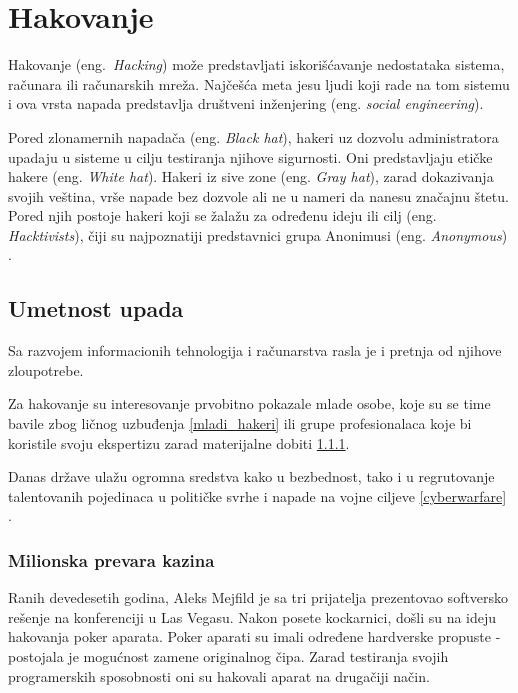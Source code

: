 \documentclass[a4paper]{article}
\begin{document}
\section{Hakovanje}
Hakovanje (eng.~{\em Hacking}) može predstavljati iskorišćavanje nedostataka sistema, računara ili računarskih mreža. Najčešća meta jesu ljudi koji rade na tom sistemu i ova vrsta napada predstavlja društveni inženjering (eng. \textit{social engineering}).

Pored zlonamernih napadača (eng. \textit{Black hat}), hakeri uz dozvolu administratora upadaju u sisteme u cilju testiranja njihove sigurnosti. Oni predstavljaju etičke hakere (eng. \textit{White hat}). Hakeri iz sive zone (eng. \textit{Gray hat}), zarad dokazivanja svojih veština, vrše napade bez dozvole ali ne u nameri da nanesu značajnu štetu. Pored njih postoje hakeri koji se žalažu za određenu ideju ili cilj (eng. \textit{Hacktivists}), čiji su najpoznatiji predstavnici grupa Anonimusi (eng. \textit{Anonymous}) \cite{hackers_hat}.
 
\subsection{Umetnost upada}
\label{sec:intrusion}

Sa razvojem informacionih tehnologija i računarstva rasla je i pretnja od njihove zloupotrebe. 

Za hakovanje su interesovanje prvobitno pokazale mlade osobe, koje su se time bavile zbog ličnog uzbuđenja \ref{mladi_hakeri} ili grupe profesionalaca koje bi koristile svoju ekspertizu zarad materijalne dobiti \ref{milionska_prevara_kazina}.

Danas države ulažu ogromna sredstva kako u bezbednost, tako i u regrutovanje talentovanih pojedinaca u političke svrhe i napade na vojne ciljeve \ref{cyberwarfare} \cite{intrusion}.

\subsubsection{Milionska prevara kazina}
\label{milionska_prevara_kazina}

Ranih devedesetih godina, Aleks Mejfild je sa tri prijatelja prezentovao softversko rešenje na konferenciji u Las Vegasu. Nakon posete kockarnici, došli su na ideju hakovanja poker aparata. Poker aparati su imali određene hardverske propuste - postojala je mogućnost zamene originalnog čipa. Zarad testiranja svojih programerskih sposobnosti oni su hakovali aparat na drugačiji način.
\end{document}
